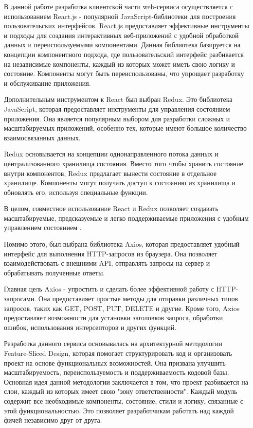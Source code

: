 В данной работе разработка клиентской части web-сервиса осуществляется с использованием React.js - популярной JavaScript-библиотеки для построения пользовательских интерфейсов. React.js предоставляет эффективные инструменты и подходы для создания интерактивных веб-приложений с удобной обработкой данных и переиспользуемыми компонентами. Данная библиотека базируется на концепции компонентного подхода, где пользовательский интерфейс разбивается на независимые компоненты, каждый из которых может иметь свою логику и состояние. Компоненты могут быть переиспользованы, что упрощает разработку и обслуживание приложения.

Дополнительным инструментом к React был выбран Redux. Это библиотека JavaScript, которая предоставляет инструменты для управления состоянием приложения. Она является популярным выбором для разработки сложных и масштабируемых приложений, особенно тех, которые имеют большое количество взаимосвязанных данных.

Redux основывается на концепции однонаправленного потока данных и централизованного хранилища состояния. Вместо того чтобы хранить состояние внутри компонентов, Redux предлагает вынести состояние в отдельное хранилище. Компоненты могут получать доступ к состоянию из хранилища и обновлять его, используя специальные функции.

В целом, совместное использование React и Redux позволяет создавать масштабируемые, предсказуемые и легко поддерживаемые приложения с удобным управлением состоянием \cite{React&Redux}. 

Помимо этого, был выбрана библиотека Axios, которая предоставляет удобный интерфейс для выполнения HTTP-запросов из браузера. Она позволяет взаимодействовать с внешними API, отправлять запросы на сервер и обрабатывать полученные ответы.

Главная цель Axios - упростить и сделать более эффективной работу с HTTP-запросами. Она предоставляет простые методы для отправки различных типов запросов, таких как GET, POST, PUT, DELETE и другие. Кроме того, Axios предоставляет возможности для установки заголовков запроса, обработки ошибок, использования интерсепторов и других функций.

Разработка данного сервиса основывалась на архитектурной методологии Feature-Sliced Design, которая помогает структурировать код и организовать проект на основе функциональных возможностей. Она призвана улучшить масштабируемость, переиспользуемость и поддерживаемость кодовой базы. Основная идея данной методологии заключается в том, что проект разбивается на слои, каждый из которых имеет свою "зону ответственности". Каждый модуль содержит все необходимые компоненты, состояние, стили и логику, связанные с этой функциональностью. Это позволяет разработчикам работать над каждой фичей независимо друг от друга.

